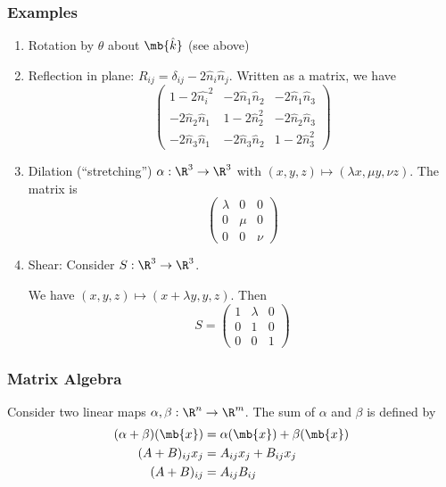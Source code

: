 \documentclass[a4paper]{article}
\begin{document}
\subsubsection{Examples}
\begin{enumerate}
\item Rotation by $\theta$ about $\mb{\hat k}$ (see above)
\item Reflection in plane: $R_{ij} = \delta_{ij} - 2\hat n_i\hat n_j$. Written as a matrix, we have
  \[
  \begin{pmatrix}
    1 - 2\hat{n_i}^2 & -2\hat n_1\hat n_2 & -2\hat n_1\hat n_3\\
    -2\hat n_2\hat n_1 & 1 - 2\hat n_2^2 & -2\hat n_2\hat n_3\\
    -2\hat n_3\hat n_1 & -2\hat n_3\hat n_2 & 1 - 2\hat n_3^2
  \end{pmatrix}
  \]
\item Dilation (``stretching'') $\alpha: \R^3 \to \R^3$ with $(x, y, z)\mapsto (\lambda x, \mu y, \nu z)$. The matrix is
  \[
  \begin{pmatrix}
    \lambda & 0 & 0\\
    0 & \mu & 0\\
    0 & 0 & \nu
  \end{pmatrix}
  \]
\item Shear: Consider $S:\R^3 \to \R^3$.


We have $(x, y, z)\mapsto (x + \lambda y, y, z)$. Then
\[
S =
\begin{pmatrix}
  1 & \lambda & 0\\
  0 & 1 & 0\\
  0 & 0 & 1
\end{pmatrix}
\]
\end{enumerate}

\subsubsection{Matrix Algebra}
\begin{defi} Consider two linear maps $\alpha, \beta: \R^n\to \R^m$. The sum of $\alpha$ and $\beta$ is defined by
  \begin{align*}
    (\alpha + \beta)(\mb{x}) &= \alpha(\mb{x}) + \beta(\mb{x})\\
    (A + B)_{ij}x_j &= A_{ij}x_j + B_{ij}x_j\\
    (A + B)_{ij} &= A_{ij}B_{ij}
  \end{align*}
\end{defi}
\end{document}
